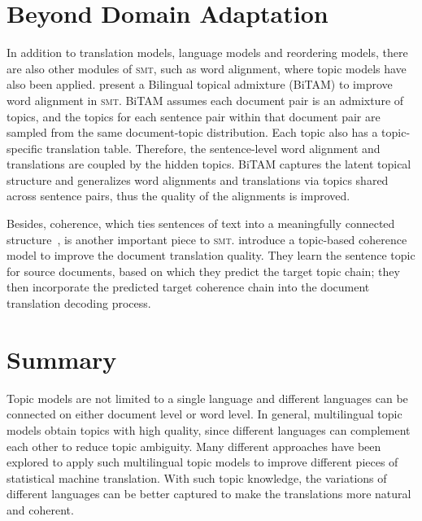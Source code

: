 \section{Beyond Domain Adaptation}

In addition to translation models, language models and reordering models,
there are also other modules of \textsc{smt}, such as word alignment,
where topic models have also been applied. \citet{zhao-06} present a
Bilingual topical admixture (BiTAM) to improve  word
alignment in \textsc{smt}. BiTAM assumes each document pair is an
admixture of topics, and the topics for each sentence pair within that
document pair are sampled from the same document-topic
distribution. Each topic also has a topic-specific translation
table. Therefore, the sentence-level word alignment and translations
are coupled by the hidden topics.  BiTAM captures the latent
topical structure and generalizes word alignments and translations via
topics shared across sentence pairs, thus the quality of the
alignments is improved.

Besides, coherence, which ties sentences of text into a meaningfully
connected structure~\citep{xiong-13}, is another important piece to
\textsc{smt}. \citet{xiong-13} introduce a topic-based coherence model
to improve the document translation quality. They learn the sentence
topic for source documents, based on which they predict the target
topic chain; they then incorporate the predicted target coherence
chain into the document translation decoding process.

\section{Summary}

Topic models are not limited to a single language and different languages
can be connected on either document level or word level.
In general, multilingual topic models obtain topics with high quality,
since different languages can complement each other to reduce topic
ambiguity. Many different approaches have been explored to apply such
multilingual topic models to improve different pieces of statistical
machine translation. With such topic knowledge, the variations of
different languages can be better captured to make the translations
more natural and coherent.
